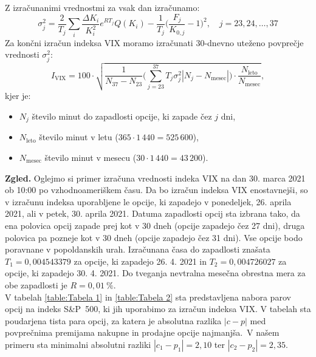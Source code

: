 \documentclass[12pt,a4paper, reqno]{amsart}
\theoremstyle{definition} %
\theoremstyle{plain} %
\begin{document}
Z izračunanimi vrednostmi za vsak dan izračunamo:
$$
\sigma_j^2 = \frac{2}{T_j}\sum_{i}{}\frac{\Delta K_i}{K_i^2}e^{RT_j}Q(K_i) - \frac{1}{T_j} \Bigg (\frac{F_j}{K_{0,j}} - 1\Bigg )^2, \quad  j = 23, 24, \dots, 37
$$
Za končni izračun indeksa VIX moramo izračunati 30-dnevno uteženo povprečje vrednosti $\sigma_j^2$:
\begin{equation}
\label{eqn:vix}
I_{\text{VIX}} = 100 \cdot \sqrt{\frac{1}{N_{37}-N_{23}}\Bigg (\sum_{j=23}^{37}T_j\sigma_j^2\left\lvert N_j - N_{\text{mesec}}\right\rvert \Bigg) \cdot \frac{N_{\text{leto}}}{N_{\text{mesec}}}},
\end{equation}
kjer je:
\begin{itemize}
\item $N_j$ število minut do zapadlosti opcije, ki zapade čez $j$ dni,
\item $N_{\text{leto}}$ število minut v letu ($365\cdot1\,440=525\,600$),
\item $N_{\text{mesec}}$ število minut v mesecu ($30\cdot1\,440=43\,200$).
\end{itemize}
\textbf{Zgled.} Oglejmo si primer izračuna vrednosti indeka VIX na dan 30. marca 2021 ob 10:00 po vzhodnoameriškem času.
Da bo izračun indeksa VIX enostavnejši, so v izračunu indeksa uporabljene le opcije, ki zapadejo v ponedeljek, 26. aprila 2021, ali v petek, 30. aprila 2021.
Datuma zapadlosti opcij sta izbrana tako, da ena polovica opcij zapade prej kot v 30 dneh (opcije zapadejo čez 27 dni), druga polovica pa pozneje kot v 30 dneh (opcije zapadejo čez 31 dni). Vse opcije bodo poravnane v popoldanskih urah. 
Izračunana časa do zapadlosti znašata $T_1 = 0,\!004543379$ za opcije, ki zapadejo 26. 4. 2021 in $T_2 = 0,\!004726027$ za opcije, ki zapadejo 30. 4. 2021. Do tveganja nevtralna mesečna obrestna mera za obe zapadlosti je $R=0,\!01~\%$.\\

V tabelah \ref{table:Tabela 1} in \ref{table:Tabela 2} sta predstavljena nabora parov opcij na indeks S\&P~500, ki jih uporabimo za izračun indeksa VIX. V tabelah sta poudarjena tista para opcij, za katera je absolutna razlika $|c-p|$ med povprečnima premijama nakupne in prodajne opcije najmanjša.\
V našem primeru sta minimalni absolutni razliki $|c_1 - p_1| = 2,\!10$ ter $|c_2 - p_2| = 2,\!35$.\
\end{document}
